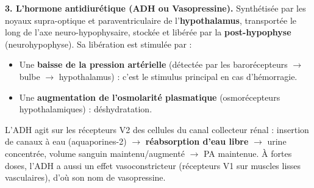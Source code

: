\documentclass[11pt]{article}
\begin{document}
\textbf{3. L'hormone antidiurétique (ADH ou Vasopressine).} Synthétisée par les noyaux supra-optique et paraventriculaire de l'\textbf{hypothalamus}, transportée le long de l'axe neuro-hypophysaire, stockée et libérée par la \textbf{post-hypophyse} (neurohypophyse). Sa libération est stimulée par :
\begin{itemize}
\item Une \textbf{baisse de la pression artérielle} (détectée par les barorécepteurs $\rightarrow$ bulbe $\rightarrow$ hypothalamus) : c'est le stimulus principal en cas d'hémorragie.
\item Une \textbf{augmentation de l'osmolarité plasmatique} (osmorécepteurs hypothalamiques) : déshydratation.
\end{itemize}
L'ADH agit sur les récepteurs V2 des cellules du canal collecteur rénal : insertion de canaux à eau (aquaporines-2) $\rightarrow$ \textbf{réabsorption d'eau libre} $\rightarrow$ urine concentrée, volume sanguin maintenu/augmenté $\rightarrow$ PA maintenue. À fortes doses, l'ADH a aussi un effet vasoconstricteur (récepteurs V1 sur muscles lisses vasculaires), d'où son nom de vasopressine.
\end{document}
